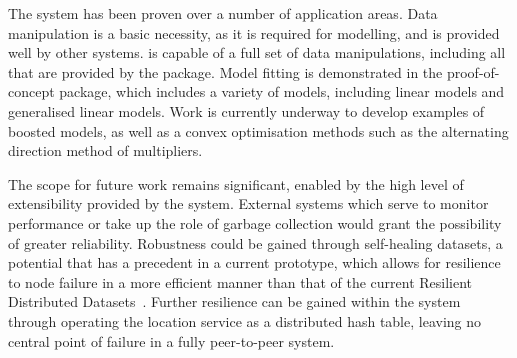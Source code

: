 The \lsr{} system has been proven over a number of application areas.
Data manipulation is a basic necessity, as it is required for modelling, and is provided well by other systems.
\lsr{} is capable of a full set of data manipulations, including all that are provided by the  package.
Model fitting is demonstrated in the proof-of-concept  package, which includes a variety of models, including linear models and generalised linear models.
Work is currently underway to develop examples of boosted models, as well as a convex optimisation methods such as the alternating direction method of multipliers.

The scope for future work remains significant, enabled by the high level of extensibility provided by the system.
External systems which serve to monitor performance or take up the role of garbage collection would grant the possibility of greater reliability.
Robustness could be gained through self-healing datasets, a potential that has a precedent in a current prototype, which allows for resilience to node failure in a more efficient manner than that of the current Resilient Distributed Datasets~\cite{zaharia2012resilient}.
Further resilience can be gained within the system through operating the location service as a distributed hash table, leaving no central point of failure in a fully peer-to-peer system.
